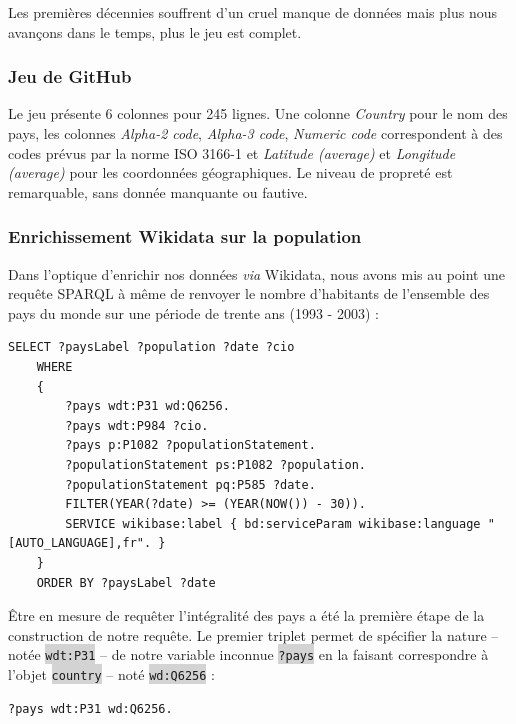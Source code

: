 \documentclass[hidelinks, 12pt]{article}
\newcommand{\code}[1]{\colorbox{LightGray}{\texttt{#1}}}
\begin{document}
Les premières décennies souffrent d'un cruel manque de données mais plus nous avançons dans le temps, plus le jeu est complet. 





\subsubsection{Jeu de GitHub}

Le jeu présente 6 colonnes pour 245 lignes. Une colonne \emph{Country} pour le nom des pays, les colonnes \emph{Alpha-2 code}, \emph{Alpha-3 code}, \emph{Numeric code} correspondent à des codes prévus par la norme ISO 3166-1 et \emph{Latitude (average)} et \emph{Longitude (average)} pour les coordonnées géographiques. Le niveau de propreté est remarquable, sans donnée manquante ou fautive.





\subsubsection{Enrichissement Wikidata sur la population}

Dans l'optique d'enrichir nos données \emph{via} Wikidata, nous avons mis au point une requête SPARQL à même de renvoyer le nombre d'habitants de l'ensemble des pays du monde sur une période de trente ans (1993 - 2003) :
		
\begin{lstlisting}[language=SPARQL]
	SELECT ?paysLabel ?population ?date ?cio
	WHERE 
	{
		?pays wdt:P31 wd:Q6256.
		?pays wdt:P984 ?cio.
		?pays p:P1082 ?populationStatement.
		?populationStatement ps:P1082 ?population. 
		?populationStatement pq:P585 ?date.
		FILTER(YEAR(?date) >= (YEAR(NOW()) - 30)).
		SERVICE wikibase:label { bd:serviceParam wikibase:language "[AUTO_LANGUAGE],fr". }
	}
	ORDER BY ?paysLabel ?date
\end{lstlisting}

Être en mesure de requêter l'intégralité des pays a été la première étape de la construction de notre requête. Le premier triplet permet de spécifier la nature -- notée \code{wdt:P31} -- de notre variable inconnue \code{?pays} en la faisant correspondre à l'objet \code{country} -- noté \code{wd:Q6256} :
		
\begin{lstlisting}[language=SPARQL]
	?pays wdt:P31 wd:Q6256.
\end{lstlisting}
\end{document}
